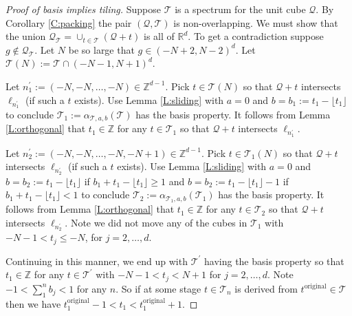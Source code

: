 \documentclass[12pt]{amsart}
\theoremstyle{plain}
\numberwithin{equation}{section}
\newcommand{\Q}{\ensuremath{\mathcal{Q}}\xspace}
\newcommand{\T}{\ensuremath{\mathcal{T}}\xspace}
\newcommand{\Rd}{\ensuremath{\mathbb{R}^{d}}\xspace}
\newcommand{\Z}{\ensuremath{\mathbb{Z}}\xspace}
\begin{document}
\begin{proof}[Proof of basis implies tiling]
   Suppose \T is a spectrum for the unit cube \Q. By Corollary
   \ref{C:packing} the pair $(\Q,\T)$ is non-overlapping. We must
   show that the union $\Q_{\T}=\cup_{t\in\T}(\Q+t)$ is all of \Rd.
   To get
   a contradiction suppose $g\notin\Q_{\T}$.
   Let $N$ be so large that
   $g\in(-N+2,N-2)^d$. Let $\T(N):=\T\cap(-N-1,N+1)^d$.
 
   Let $n^{\prime}_1:=(-N,-N,\ldots,-N)\in\Z^{d-1}$.
   Pick $t\in\T(N)$ so that $\Q+t$ intersects $\ell_{n^{\prime}_1}$
   (if such a $t$ exists). Use Lemma \ref{L:sliding} with $a=0$ and
   $b=b_1:=t_1-\lfloor t_1 \rfloor$ to conclude
   $\T_1:=\alpha_{\T,a,b}(\T)$ has the basis property. It follows
   from Lemma \ref{L:orthogonal} that
   $t_1\in\Z$ for any $t\in\T_1$ so that
   $\Q+t$ intersects $\ell_{n^{\prime}_1}$.
 
   Let $n^{\prime}_2:=(-N,-N,\ldots,-N,-N+1)\in\Z^{d-1}$.
   Pick $t\in\T_{1}(N)$ so that $\Q+t$ intersects
   $\ell_{n^{\prime}_2}$ (if such a $t$ exists).
   Use Lemma \ref{L:sliding} with $a=0$ and
   $b=b_2:=t_1-\lfloor t_1 \rfloor$ if
   $b_1+t_1-\lfloor t_1\rfloor\geq 1$
   and $b=b_2:=t_1-\lfloor t_1 \rfloor-1$ if
   $b_1+t_1-\lfloor t_1\rfloor<1$ to conclude
   $\T_2:=\alpha_{\T_1,a,b}(\T_1)$ has the basis property.
   It follows from Lemma \ref{L:orthogonal} that
   $t_1\in\Z$ for any $t\in\T_2$ so that $\Q+t$ intersects
   $\ell_{n^{\prime}_2}$. Note we did not move any of the cubes in
   $\T_1$ with $-N-1<t_j\leq-N$, for $j=2,\ldots,d$.

   Continuing in this manner, we end up with $\T^{\prime}$ having
   the basis property so that $t_1\in\Z$ for any $t\in\T^{\prime}$
   with $-N-1<t_j<N+1$ for $j=2,\ldots,d$. Note $-1<\sum_1^n b_j<1$
   for any $n$. So if at some stage $t\in\T_n$ is derived from
   $t^{\text{original}}\in\T$ then we have
   $t^{\text{original}}_1-1<t_1<t^{\text{original}}_1+1$.
 

\end{proof}
\end{document}

